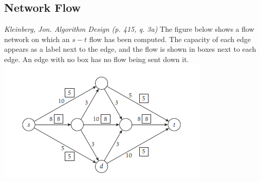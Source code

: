 \documentclass[solutionorbox,answers]{exam} %
\begin{document}
\begin{center}
\end{center}
\vspace{0.1in}
 \qquad
{}

\begin{questions}

\section*{Network Flow}

\question
\emph{Kleinberg, Jon. Algorithm Design (p. 415, q. 3a)}
The figure below shows a flow network on which an $s-t$ flow has been computed. The capacity of each edge appears as a label next to the edge, and the flow is shown in boxes next to each edge. An edge with no box has no flow being sent down it.
\includegraphics[width=0.6\linewidth]{FlowGraph.png}
\end{questions}
\end{document}
